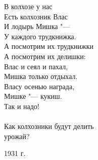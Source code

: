 
\begin{center}
    \begin{varwidth}{\linewidth}
        В колхозе у нас \\
        Есть колхозник Влас \\
        И лодырь Мишка "--- \\
        У каждого трудкнижка. \\
        А посмотрим их трудкнижки \\
        А посмотрим их делишки: \\
        Влас и сеял и пахал, \\
        Мишка только отдыхал. \\
        Власу осенью награда, \\
        Мишке "--- кукиш. \\
        Так и надо! \\
        \\
        Как колхозники будут делить \\
        урожай?

        \vspace{2ex}
        \hfill 1931 г.
    \end{varwidth}
\end{center}

